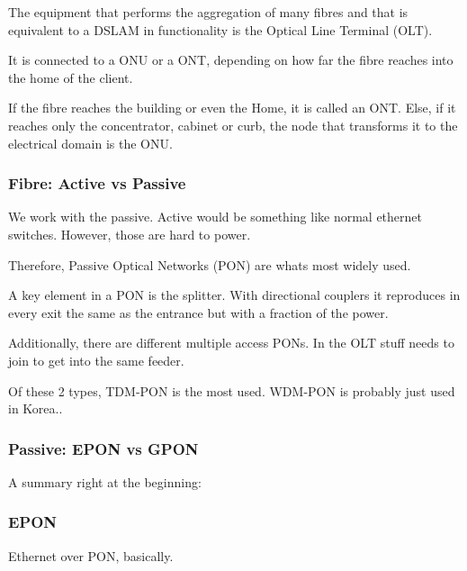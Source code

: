 The equipment that performs the aggregation of many fibres and that is equivalent to a DSLAM in functionality is the Optical Line Terminal (OLT).


It is connected to a ONU or a ONT, depending on how far the fibre reaches into the home of the client.


If the fibre reaches the building or even the Home, it is called an ONT. Else, if it reaches only the concentrator, cabinet or curb, the node that transforms it to the electrical domain is the ONU.



\subsubsection{Fibre: Active vs Passive}


We work with the passive. Active would be something like normal ethernet switches. However, those are hard to power.

Therefore, Passive Optical Networks (PON) are whats most widely used.

A key element in a PON is the splitter. With directional couplers it reproduces in every exit the same as the entrance but with a fraction of the power.



Additionally, there are different multiple access PONs. In the OLT stuff needs to join to get into the same feeder. 



Of these 2 types, TDM-PON is the most used. WDM-PON is probably just used in Korea..





\subsubsection{Passive: EPON vs GPON}
A summary right at the beginning:

\subsubsection*{EPON}
Ethernet over PON, basically.

